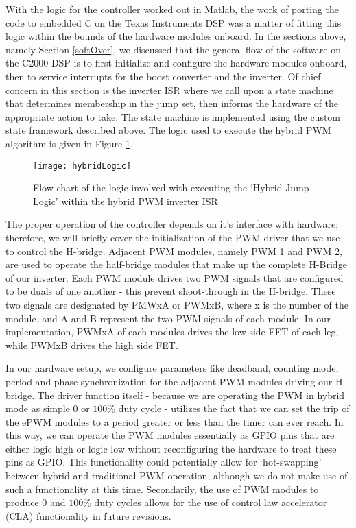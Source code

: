With the logic for the controller worked out in Matlab, the work of porting the code to embedded C on the Texas Instruments DSP was a matter of fitting this logic within the bounds of the hardware modules onboard.
In the sections above, namely Section \ref{softOver}, we discussed that the general flow of the software on the C2000 DSP is to first initialize and configure the hardware modules onboard, then to service interrupts for the boost converter and the inverter. Of chief concern in this section is the inverter ISR where we call upon a state machine that determines membership in the jump set, then informs the hardware of the appropriate action to take. The state machine is implemented using the custom state framework described above. The logic used to execute the hybrid PWM algorithm is given in Figure \ref{hybridFlow}.

\begin{figure}[h]
\begin{center}
\texttt{[image: hybridLogic]}
\caption{Flow chart of the logic involved with executing the `Hybrid Jump Logic' within the hybrid PWM inverter ISR}
\label{hybridFlow}
\end{center}
\end{figure}

The proper operation of the controller depends on it's interface with hardware; therefore, we will briefly cover the initialization of the PWM driver that we use to control the H-bridge. Adjacent PWM modules, namely PWM 1 and PWM 2, are used to operate the half-bridge modules that make up the complete H-Bridge of our inverter. Each PWM module drives two PWM signals that are configured to be duals of one another - this prevent shoot-through in the H-bridge. These two signals are designated by PMWxA or PWMxB, where x is the number of the module, and A and B represent the two PWM signals of each module. In our implementation, PWMxA of each modules drives the low-side FET of each leg, while PWMxB drives the high side FET. 

In our hardware setup, we configure parameters like deadband, counting mode, period and phase synchronization for the adjacent PWM modules driving our H-bridge. The driver function itself - because we are operating the PWM in hybrid mode as simple $0$ or $100\%$ duty cycle - utilizes the fact that we can set the trip of the ePWM modules to a period greater or less than the timer can ever reach. In this way, we can operate the PWM modules essentially as GPIO pins that are either logic high or logic low without reconfiguring the hardware to treat these pins as GPIO. This functionality could potentially allow for `hot-swapping' between hybrid and traditional PWM operation, although we do not make use of such a functionality at this time. Secondarily, the use of PWM modules to produce $0$ and $100\%$ duty cycles allows for the use of control law accelerator (CLA) functionality in future revisions. 

